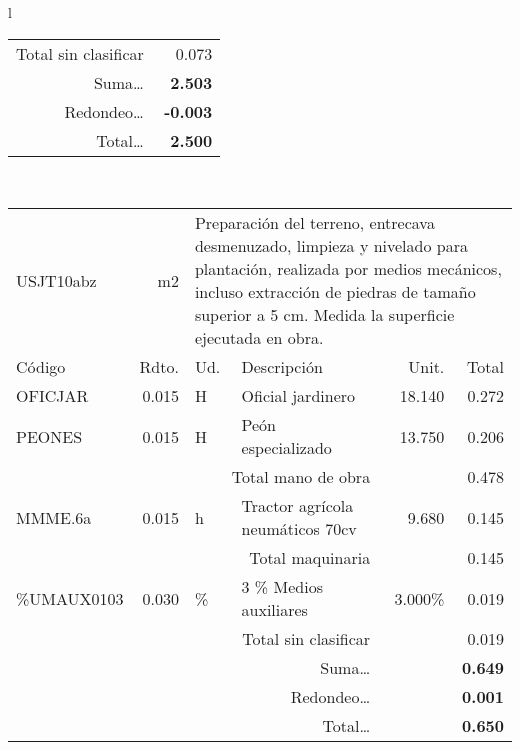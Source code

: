 \documentclass{book}%
\begin{document}
\begin{longtable}{l}
\begin{tabular}{l r l p{4cm} r r}
\multicolumn{4}{r}{Total sin clasificar}&&0.073\\%
\multicolumn{4}{r}{Suma\ldots}&\multicolumn{2}{r}{\textbf{2.503}}\\%
\multicolumn{4}{r}{Redondeo\ldots}&\multicolumn{2}{r}{\textbf{{-}0.003}}\\%
\multicolumn{4}{r}{Total\ldots}&\multicolumn{2}{r}{\textbf{2.500}}\\%
\end{tabular}\\%
\begin{tabular}{l r l p{4cm} r r}%
USJT10abz&m2&\multicolumn{4}{p{7cm}}{Preparación del terreno, entrecava desmenuzado, limpieza y nivelado para plantación, realizada por medios mecánicos, incluso extracción de piedras de tamaño superior a 5 cm. Medida la superficie ejecutada en obra.}\\%
Código&Rdto.&Ud.&Descripción&Unit.&Total\\%
\hline%
OFICJAR&0.015&H&Oficial jardinero&18.140&0.272\\%
PEONES&0.015&H&Peón especializado&13.750&0.206\\%
\multicolumn{4}{r}{Total mano de obra}&&0.478\\%
MMME.6a&0.015&h&Tractor agrícola neumáticos 70cv&9.680&0.145\\%
\multicolumn{4}{r}{Total maquinaria}&&0.145\\%
\%UMAUX0103&0.030&\%&3 \% Medios auxiliares&3.000\%&0.019\\%
\multicolumn{4}{r}{Total sin clasificar}&&0.019\\%
\multicolumn{4}{r}{Suma\ldots}&\multicolumn{2}{r}{\textbf{0.649}}\\%
\multicolumn{4}{r}{Redondeo\ldots}&\multicolumn{2}{r}{\textbf{0.001}}\\%
\multicolumn{4}{r}{Total\ldots}&\multicolumn{2}{r}{\textbf{0.650}}\\%
\end{tabular}\\%
\end{longtable}%
\normalsize

%
\end{document}

